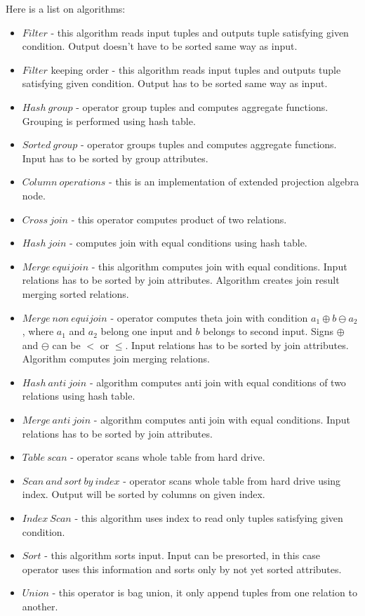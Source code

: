 Here is a list on algorithms:
\begin{itemize}
\item $Filter$ - this algorithm reads input tuples and outputs tuple satisfying given condition. Output doesn't have to be sorted same way as input.
\item $Filter$ keeping order - this algorithm reads input tuples and outputs tuple satisfying given condition. Output has to be sorted same way as input.
\item $Hash~group$ - operator group tuples and computes aggregate functions. Grouping is performed using hash table.
\item $Sorted~group$ - operator groups tuples and computes aggregate functions. Input has to be sorted by group attributes.
\item $Column~operations$ - this is an implementation of extended projection algebra node. 
\item $Cross~join$ - this operator computes product of two relations.
\item $Hash~join$ - computes join with equal conditions using hash table. 
\item $Merge~equijoin$ - this algorithm computes join with equal conditions. Input relations has to be sorted by join attributes. Algorithm creates join result merging sorted relations.
\item $Merge~non~equijoin$ - operator computes theta join with condition $a_1\oplus b \ominus a_2$, where $a_1$ and $a_2$ belong one input and $b$ belongs to second input. Signs $\oplus$ and $\ominus$ can be $<$ or $\leq$. Input relations has to be sorted by join attributes. Algorithm computes join merging relations.
\item $Hash~anti~join$ -  algorithm computes anti join with equal conditions of two relations using hash table.
\item $Merge~anti~join$ - algorithm computes anti join with equal conditions. Input relations has to be sorted by join attributes.
\item $Table~scan$ - operator scans whole table from hard drive.
\item $Scan~and~sort~by~index$ - operator scans whole table from hard drive using index. Output will be sorted by columns on given index.
\item $Index~Scan$ - this algorithm uses index to read only tuples satisfying given condition.
\item $Sort$ - this algorithm sorts input. Input can be presorted, in this case operator uses this information and sorts only by not yet sorted attributes.
\item $Union$ - this operator is bag union, it only append tuples from one relation to another.

\end{itemize}



